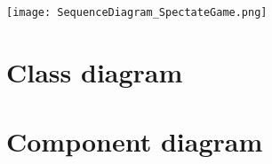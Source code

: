 \documentclass{article}
\begin{document}
\texttt{[image: SequenceDiagram\_SpectateGame.png]}
\clearpage

\section{Class diagram}
\noindent{}

\section{Component diagram}
\noindent{}
\end{document}
